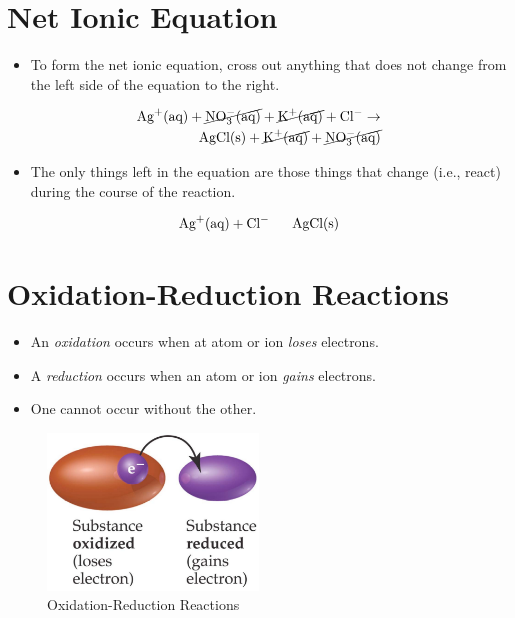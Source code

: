 \documentclass[
	chapter=4
]{chem122notes}
\begin{document}
\section{Net Ionic Equation}\label{sec:net-ionic-equation}
\begin{itemize}
	\item To form the net ionic equation, cross out anything that does not change from the left side of the equation to the right.
\end{itemize}
\begin{equation*}
	\begin{aligned}
		\element{Ag}^{+} (\mbox{aq}) + \cancel{\element{N}\element{O}[3]^{-} (\mbox{aq})} + \cancel{\element{K}^{+} (\mbox{aq})} + \element{Cl}^{-}\rightarrow\\
		\element{Ag}\element{Cl} (\mbox{s}) + \cancel{\element{K}^{+} (\mbox{aq})} + \cancel{\element{N}\element{O}[3]^{-} (\mbox{aq})}\\
	\end{aligned}
\end{equation*}
\begin{itemize}
	\item The only things left in the equation are those things that change (i.e., react) during the course of the reaction.
\end{itemize}
\begin{equation*}
	\begin{aligned}
		\element{Ag}^{+} (\mbox{aq}) + \element{Cl}^{-}\ \ \ \ \ \element{Ag}\element{Cl} (\mbox{s})
	\end{aligned}
\end{equation*}

\section{Oxidation-Reduction Reactions}\label{sec:oxidation-reduction-reactions}
\begin{itemize}
	\item An \emph{oxidation} occurs when at atom or ion \textit{loses} electrons.
	\item A \emph{reduction} occurs when an atom or ion \textit{gains} electrons.
	\item One cannot occur without the other.
\end{itemize}

\begin{figure}[H]
	\centering
	\includegraphics[width=0.5\textwidth]{chapter4/oxidation-reduction}
	\caption{Oxidation-Reduction Reactions}
	\label{fig:oxidation-reduction}
\end{figure}
\end{document}
